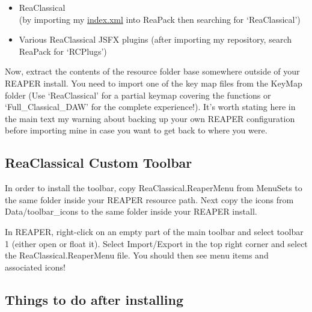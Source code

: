 \documentclass[10pt,american]{article}
\begin{document}
\begin{itemize}
\item \begin{flushleft} ReaClassical\\
(by importing my
\href{https://github.com/chmaha/ReaClassical/raw/main/index.xml}{index.xml} into
ReaPack then searching for `ReaClassical') \par\end{flushleft}
\item Various ReaClassical JSFX plugins (after importing my repository, search
ReaPack for `RCPlugs')
\end{itemize}
\noindent Now, extract the contents of the resource folder base somewhere
outside of your REAPER install. You need to import one of the key map files from
the KeyMap folder (Use `ReaClassical' for a partial keymap covering the
functions or `Full\_Classical\_DAW' for the complete experience!). It's worth
stating here in the main text my warning about backing up your own REAPER
configuration before importing mine in case you want to get back to where you
were.

\subsection{ReaClassical Custom Toolbar}

\noindent In order to install the toolbar, copy ReaClassical.ReaperMenu from
MenuSets to the same folder inside your REAPER resource path. Next copy the
icons from Data/toolbar\_icons to the same folder inside your REAPER install.
\noindent\begin{flushleft} In REAPER, right-click on an empty part of the main
toolbar and select toolbar 1 (either open or float it). Select Import/Export in
the top right corner and select the ReaClassical.ReaperMenu file. You should
then see menu items and associated icons! \par\end{flushleft}

\subsection{Things to do after installing }
\end{document}
